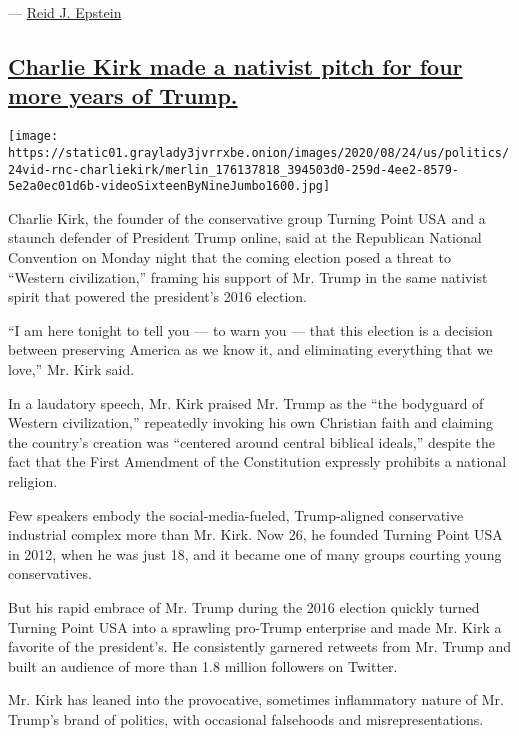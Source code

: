--- \href{https://www.nytimes3xbfgragh.onion/by/reid-j-epstein}{Reid J.
Epstein}

\hypertarget{charlie-kirk-made-a-nativist-pitch-for-four-more-years-of-trump}{%
\subsection{\texorpdfstring{\protect\hyperlink{charlie-kirk-made-a-nativist-pitch-for-four-more-years-of-trump}{Charlie
Kirk made a nativist pitch for four more years of
Trump.}}{Charlie Kirk made a nativist pitch for four more years of Trump.}}\label{charlie-kirk-made-a-nativist-pitch-for-four-more-years-of-trump}}

\texttt{[image: https://static01.graylady3jvrrxbe.onion/images/2020/08/24/us/politics/24vid-rnc-charliekirk/merlin\_176137818\_394503d0-259d-4ee2-8579-5e2a0ec01d6b-videoSixteenByNineJumbo1600.jpg]}

Charlie Kirk, the founder of the conservative group Turning Point USA
and a staunch defender of President Trump online, said at the Republican
National Convention on Monday night that the coming election posed a
threat to ``Western civilization,'' framing his support of Mr. Trump in
the same nativist spirit that powered the president's 2016 election.

``I am here tonight to tell you --- to warn you --- that this election
is a decision between preserving America as we know it, and eliminating
everything that we love,'' Mr. Kirk said.

In a laudatory speech, Mr. Kirk praised Mr. Trump as the ``the bodyguard
of Western civilization,'' repeatedly invoking his own Christian faith
and claiming the country's creation was ``centered around central
biblical ideals,'' despite the fact that the First Amendment of the
Constitution expressly prohibits a national religion.

Few speakers embody the social-media-fueled, Trump-aligned conservative
industrial complex more than Mr. Kirk. Now 26, he founded Turning Point
USA in 2012, when he was just 18, and it became one of many groups
courting young conservatives.

But his rapid embrace of Mr. Trump during the 2016 election quickly
turned Turning Point USA into a sprawling pro-Trump enterprise and made
Mr. Kirk a favorite of the president's. He consistently garnered
retweets from Mr. Trump and built an audience of more than 1.8 million
followers on Twitter.

Mr. Kirk has leaned into the provocative, sometimes inflammatory nature
of Mr. Trump's brand of politics, with occasional falsehoods and
misrepresentations.

